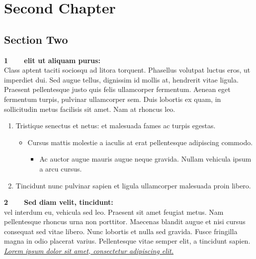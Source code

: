 \documentclass[a4paper]{book}
\begin{document}
\chapter{Second Chapter}
\section{Section Two}
\begin{flushleft}
    {\bf \Large 1\ \ \ \ elit ut aliquam purus:}\\
    \Large Class aptent taciti sociosqu ad litora torquent.
    Phasellus volutpat luctus eros, ut imperdiet dui.
    Sed augue tellus, dignissim id mollis at, hendrerit vitae ligula.
    Praesent pellentesque justo quis felis ullamcorper fermentum.
    Aenean eget fermentum turpis, pulvinar ullamcorper sem.
    Duis lobortis ex quam, in sollicitudin metus facilisis sit amet. Nam at rhoncus leo.
    \begin{enumerate}
        \item [1.] Tristique senectus et netus: et malesuada fames ac turpis egestas.
              \begin{itemize}
                  \item Cursus mattis molestie a iaculis at erat pellentesque adipiscing commodo.
                        \begin{itemize}
                            \item Ac auctor augue mauris augue neque gravida. Nullam vehicula ipsum a arcu cursus.
                        \end{itemize}
              \end{itemize}
        \item [2.] Tincidunt nunc pulvinar sapien et ligula ullamcorper malesuada proin libero.
    \end{enumerate}
    \vspace{.5cm}
    {\bf \Large 2\ \ \ \ Sed diam velit, tincidunt:}\\
    \Large vel interdum eu, vehicula sed leo.
    Praesent sit amet feugiat metus. Nam pellentesque rhoncus urna non porttitor.
    Maecenas blandit augue et nisi cursus consequat sed vitae libero.
    Nunc lobortis et nulla sed gravida. Fusce fringilla magna in odio placerat varius.
    Pellentesque vitae semper elit, a tincidunt sapien.\\
    \vspace{.5cm}
    {\em \underline{Lorem ipsum dolor sit amet, consectetur adipiscing elit.}}
\end{flushleft}
\end{document}
